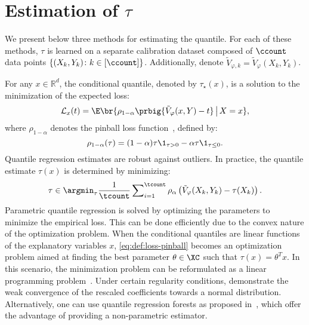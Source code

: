 \section{Estimation of $\tau$}
\label{sec:tau}
  We present below three methods for estimating the quantile. For each of these methods, \( \tau \) is learned on a separate calibration dataset composed of \( \ccount \) data points \( \{(X_k, Y_k) \colon k \in [\ccount]\} \). Additionally, denote \( \tilde{V}_{\varphi, k} = \tilde{V}_{\varphi}(X_k, Y_k) \).


\label{subsec:tau_qr}

  For any \(x \in \mathbb{R}^d\), the conditional quantile, denoted by \(\tau_\star(x)\), is a solution to the minimization of the expected loss:
  \begin{equation}\label{eq:def:loss-x}
    \mathcal{L}_x(t)
    = \E\br{\rho_{1-\alpha}\prbig{\tilde{V}_{\varphi}(x,Y) - t} \,\big\vert\, X=x},
  \end{equation}
  where \(\rho_{1-\alpha}\) denotes the pinball loss function~\cite{koenker1978regression,koenker2001quantile}, defined by:
  \begin{equation}\label{eq:def:pinball-loss}
    \rho_{1-\alpha}(\tau)=(1-\alpha) \tau \1_{\tau > 0} - \alpha \tau \1_{\tau\le 0}.
  \end{equation}
  Quantile regression estimates are robust against outliers. In practice, the quantile estimate \(\tau(x)\) is determined by minimizing:
  \begin{equation}\label{eq:def:loss-pinball}
    \tau \in \argmin_{\tau} \frac{1}{\tcount} \sum\nolimits_{i=1}^{\tcount} \rho_\alpha \left(\tilde{V}_{\varphi}(X_k,Y_k) - \tau(X_k)\right).
  \end{equation}
  Parametric quantile regression is solved by optimizing the parameters to minimize the empirical loss. This can be done efficiently due to the convex nature of the optimization problem. When the conditional quantiles are linear functions of the explanatory variables \(x\), \eqref{eq:def:loss-pinball} becomes an optimization problem aimed at finding the best parameter \(\theta \in \XC\) such that \(\tau(x) = \theta^T x\). In this scenario, the minimization problem can be reformulated as a linear programming problem~\cite{chen2005computational}.
  Under certain regularity conditions, \cite{koenker2005quantile} demonstrate the weak convergence of the rescaled coefficients towards a normal distribution. Alternatively, one can use quantile regression forests as proposed in~\cite{meinshausen2006quantile}, which offer the advantage of providing a non-parametric estimator.


